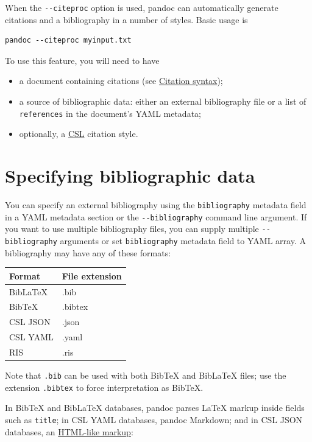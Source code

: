 \documentclass[
  b5paper
]{book}
\providecommand{\tightlist}{%
  \setlength{\itemsep}{0pt}\setlength{\parskip}{0pt}}
\begin{document}
When the \texttt{-\/-citeproc} option is used, pandoc can automatically
generate citations and a bibliography in a number of styles. Basic usage
is

\begin{verbatim}
pandoc --citeproc myinput.txt
\end{verbatim}

To use this feature, you will need to have

\begin{itemize}
\tightlist
\item
  a document containing citations (see
  \hyperref[citation-syntax]{Citation syntax});
\item
  a source of bibliographic data: either an external bibliography file
  or a list of \texttt{references} in the document's YAML metadata;
\item
  optionally, a
  \href{https://docs.citationstyles.org/en/stable/specification.html}{CSL}
  citation style.
\end{itemize}

\section{Specifying bibliographic
data}\label{specifying-bibliographic-data}

You can specify an external bibliography using the \texttt{bibliography}
metadata field in a YAML metadata section or the
\texttt{-\/-bibliography} command line argument. If you want to use
multiple bibliography files, you can supply multiple
\texttt{-\/-bibliography} arguments or set \texttt{bibliography}
metadata field to YAML array. A bibliography may have any of these
formats:

\begin{longtable}[]{@{}ll@{}}
\toprule\noalign{}
Format & File extension \\
\midrule\noalign{}
\endhead
\bottomrule\noalign{}
\endlastfoot
BibLaTeX & .bib \\
BibTeX & .bibtex \\
CSL JSON & .json \\
CSL YAML & .yaml \\
RIS & .ris \\
\end{longtable}

Note that \texttt{.bib} can be used with both BibTeX and BibLaTeX files;
use the extension \texttt{.bibtex} to force interpretation as BibTeX.

In BibTeX and BibLaTeX databases, pandoc parses LaTeX markup inside
fields such as \texttt{title}; in CSL YAML databases, pandoc Markdown;
and in CSL JSON databases, an
\href{https://citeproc-js.readthedocs.io/en/latest/csl-json/markup.html\#html-like-formatting-tags}{HTML-like
markup}:
\end{document}
